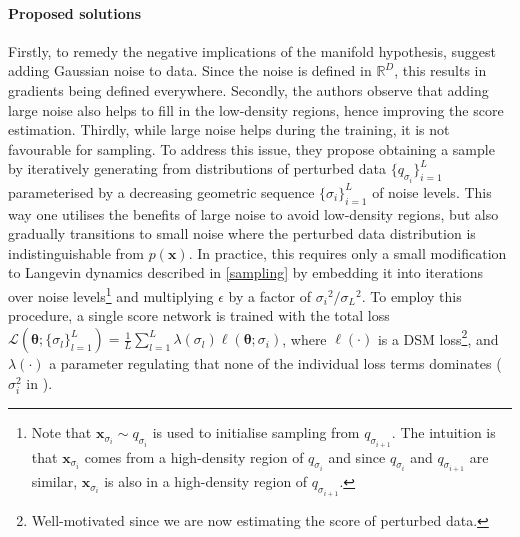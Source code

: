 \paragraph{Proposed solutions}
Firstly, to remedy the negative implications of the manifold hypothesis, \citet{ncsn-paper} suggest adding Gaussian noise to data. Since the noise is defined in $\mathbb{R}^D$, this results in gradients being defined everywhere. Secondly, the authors observe that adding large noise also helps to fill in the low-density regions, hence improving the score estimation. Thirdly, while large noise helps during the training, it is not favourable for sampling. To address this issue, they propose obtaining a sample by iteratively generating from distributions of perturbed data $\{q_{\sigma_i}\}_{i=1}^L$ parameterised by a decreasing geometric sequence $\{\sigma_i\}_{i=1}^L$ of noise levels. This way one utilises the benefits of large noise to avoid low-density regions, but also gradually transitions to small noise where the perturbed data distribution is indistinguishable from $p(\mathbf{x})$. In practice, this requires only a small modification to Langevin dynamics described in \autoref{sampling} by embedding it into iterations over noise levels\footnote{Note that $\mathbf{x}_{\sigma_i} \sim q_{\sigma_i}$ is used to initialise sampling from $q_{\sigma_{i+1}}$. The intuition is that $\mathbf{x}_{\sigma_i}$ comes from a high-density region of $q_{\sigma_i}$ and since $q_{\sigma_i}$ and $q_{\sigma_{i+1}}$ are similar, $\mathbf{x}_{\sigma_i}$ is also in a high-density region of $q_{\sigma_{i+1}}$.} and multiplying $\epsilon$ by a factor of ${\sigma_i}^2/{\sigma_L}^2$. To employ this procedure, a single score network is trained with the total loss $\mathcal{L}(\bm{\theta}; \{\sigma_l\}_{l=1}^L) = \frac{1}{L}\sum_{l=1}^L \lambda(\sigma_l) \ell (\bm{\theta}; \sigma_i)$, where $\ell(\cdot)$ is a DSM loss\footnote{Well-motivated since we are now estimating the score of perturbed data.}, and $\lambda(\cdot)$ a parameter regulating that none of the individual loss terms dominates ($\sigma_i^2$ in \cite{ncsn-paper}).

